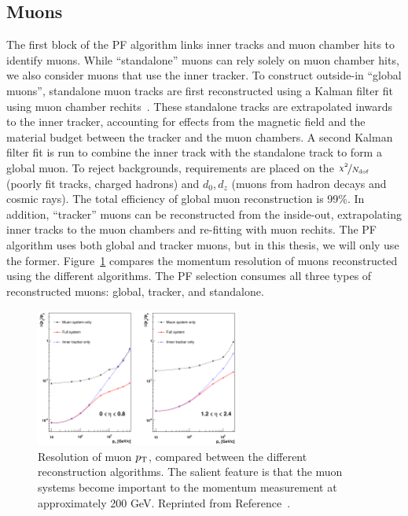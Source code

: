 \subsection{Muons}
\label{sec:cms:muons}

The first block of the PF algorithm links inner tracks and muon chamber hits to identify muons.
While ``standalone'' muons can rely solely on muon chamber hits, we also consider muons that use the inner tracker.
To construct outside-in ``global muons'', standalone muon tracks are first reconstructed using a Kalman filter fit using muon chamber rechits~\cite{cmstdr1,cmsmuon}.
These standalone tracks are extrapolated inwards to the inner tracker, accounting for effects from the magnetic field and the  material budget between the tracker and the muon chambers.
A second Kalman filter fit is run to combine the inner track with the standalone track to form a global muon.
To reject backgrounds, requirements are placed on the $\nicefrac{\chi^2}{N_\mathrm{dof}}$ (poorly fit tracks, charged hadrons) and $d_0,d_z$ (muons from hadron decays and cosmic rays).
The total efficiency of global muon reconstruction is 99\%.
In addition, ``tracker'' muons can be reconstructed from the inside-out, extrapolating inner tracks to the muon chambers and re-fitting with muon rechits.
The PF algorithm uses both global and tracker muons, but in this thesis, we will only use the former.
Figure~\ref{fig:cms:muonpt} compares the momentum resolution of muons reconstructed using the different algorithms.  
The PF selection consumes all three types of reconstructed muons: global, tracker, and standalone.

\begin{figure}[]
\begin{center}
	\includegraphics[width=0.6\textwidth]{figures/cms/muonpt.png}
	\caption{Resolution of muon $p_\mathrm{T}$, compared between the different reconstruction algorithms. 
			 The salient feature is that the muon systems become important to the momentum measurement at approximately 200 GeV.
			 Reprinted from Reference~\cite{cmsmuon}.}
	\label{fig:cms:muonpt}
\end{center}
\end{figure}

